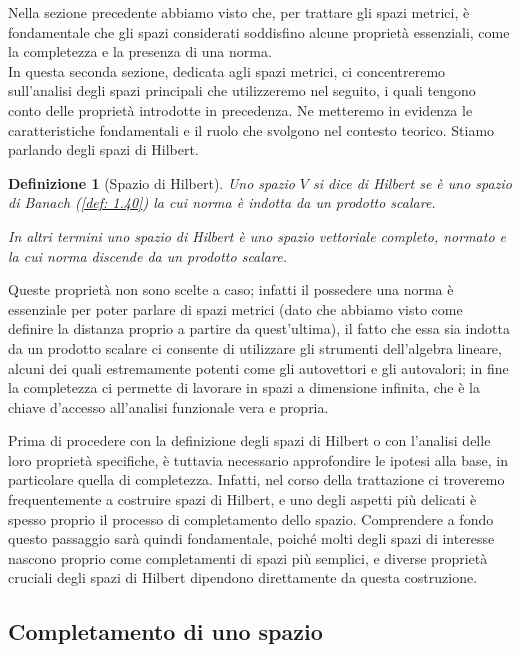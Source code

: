 \documentclass[a4paper,12pt]{report}
\newtheorem{definizione}{Definizione}[chapter]
\begin{document}
Nella sezione precedente abbiamo visto che, per trattare gli spazi metrici, è fondamentale che gli spazi considerati soddisfino alcune proprietà essenziali, come la completezza e la presenza di una norma.
\\
In questa seconda sezione, dedicata agli spazi metrici, ci concentreremo sull’analisi degli spazi principali che utilizzeremo nel seguito, i quali tengono conto delle proprietà introdotte in precedenza. Ne metteremo in evidenza le caratteristiche fondamentali e il ruolo che svolgono nel contesto teorico. Stiamo parlando degli spazi di Hilbert. 

\begin{definizione}[Spazio di Hilbert]\label{def: 2.7}
    Uno spazio $V$ si dice di Hilbert se è uno spazio di Banach (\ref{def: 1.40}) la cui norma è indotta da un prodotto scalare. 
    
    In altri termini uno spazio di Hilbert è uno spazio vettoriale completo, normato e la cui norma discende da un prodotto scalare.
\end{definizione}

Queste proprietà non sono scelte a caso; infatti il possedere una norma è essenziale per poter parlare di spazi metrici (dato che abbiamo visto come definire la distanza proprio a partire da quest'ultima), il fatto che essa sia indotta da un prodotto scalare ci consente di utilizzare gli strumenti dell'algebra lineare, alcuni dei quali estremamente potenti come gli autovettori e gli autovalori; in fine la completezza ci permette di lavorare in spazi a dimensione infinita, che è la chiave d'accesso all'analisi funzionale vera e propria.

Prima di procedere con la definizione degli spazi di Hilbert o con l’analisi delle loro proprietà specifiche, è tuttavia necessario approfondire le ipotesi alla base, in particolare quella di completezza.
Infatti, nel corso della trattazione ci troveremo frequentemente a costruire spazi di Hilbert, e uno degli aspetti più delicati è spesso proprio il processo di completamento dello spazio. Comprendere a fondo questo passaggio sarà quindi fondamentale, poiché molti degli spazi di interesse nascono proprio come completamenti di spazi più semplici, e diverse proprietà cruciali degli spazi di Hilbert dipendono direttamente da questa costruzione.

\newpage

\subsection{Completamento di uno spazio}
\end{document}
